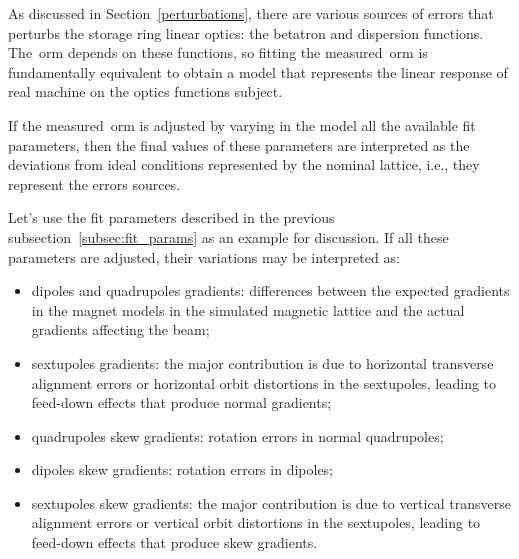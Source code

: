 As discussed in Section~\ref{perturbations}, there are various sources of errors that perturbs the storage ring linear optics: the betatron and dispersion functions. The~\gls{orm} depends on these functions, so fitting the measured~\gls{orm} is fundamentally equivalent to obtain a model that represents the linear response of real machine on the optics functions subject.

If the measured~\gls{orm} is adjusted by varying in the model all the available fit parameters, then the final values of these parameters are interpreted as the deviations from ideal conditions represented by the nominal lattice, i.e., they represent the errors sources. 

Let's use the fit parameters described in the previous subsection~\ref{subsec:fit_params} as an example for discussion. If all these parameters are adjusted, their variations may be interpreted as:
\begin{itemize}
    \item dipoles and quadrupoles gradients: differences between the expected gradients in the magnet models in the simulated magnetic lattice and the actual gradients affecting the beam;
    \item sextupoles gradients: the major contribution is due to horizontal transverse alignment errors or horizontal orbit distortions in the sextupoles, leading to feed-down effects that produce normal gradients;
    \item quadrupoles skew gradients: rotation errors in normal quadrupoles;
    \item dipoles skew gradients: rotation errors in dipoles;
    \item sextupoles skew gradients: the major contribution is due to vertical transverse alignment errors or vertical orbit distortions in the sextupoles, leading to feed-down effects that produce skew gradients. 
    \end{itemize}
